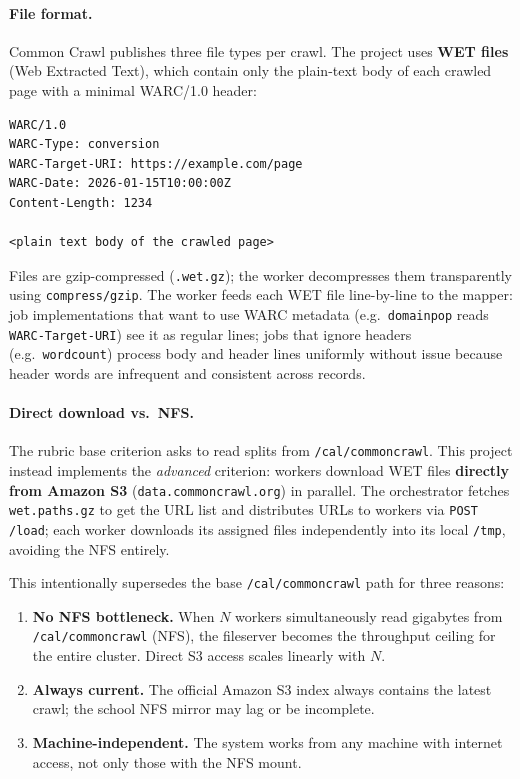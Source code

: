 \documentclass[11pt,a4paper]{article}
\begin{document}
\paragraph{File format.}
Common Crawl publishes three file types per crawl. The project uses
\textbf{WET files} (Web Extracted Text), which contain only the plain-text
body of each crawled page with a minimal WARC/1.0 header:
\begin{lstlisting}[style=codeblock]
WARC/1.0
WARC-Type: conversion
WARC-Target-URI: https://example.com/page
WARC-Date: 2026-01-15T10:00:00Z
Content-Length: 1234

<plain text body of the crawled page>
\end{lstlisting}
Files are gzip-compressed (\texttt{.wet.gz}); the worker decompresses them
transparently using \texttt{compress/gzip}. The worker feeds each WET file
line-by-line to the mapper: job implementations that want to use WARC metadata
(e.g.\ \texttt{domainpop} reads \texttt{WARC-Target-URI}) see it as regular
lines; jobs that ignore headers (e.g.\ \texttt{wordcount}) process body and
header lines uniformly without issue because header words are infrequent and
consistent across records.

\paragraph{Direct download vs.\ NFS.}
The rubric base criterion asks to read splits from \texttt{/cal/commoncrawl}.
This project instead implements the \emph{advanced} criterion: workers download
WET files \textbf{directly from Amazon S3} (\texttt{data.commoncrawl.org}) in
parallel. The orchestrator fetches \texttt{wet.paths.gz} to get the URL list and
distributes URLs to workers via \texttt{POST /load}; each worker downloads its
assigned files independently into its local \texttt{/tmp}, avoiding the NFS
entirely.

This intentionally supersedes the base \texttt{/cal/commoncrawl} path for three
reasons:
\begin{enumerate}[leftmargin=1.5em]
  \item \textbf{No NFS bottleneck.} When $N$ workers simultaneously read
  gigabytes from \texttt{/cal/commoncrawl} (NFS), the fileserver becomes the
  throughput ceiling for the entire cluster. Direct S3 access scales linearly
  with $N$.
  \item \textbf{Always current.} The official Amazon S3 index always contains the
  latest crawl; the school NFS mirror may lag or be incomplete.
  \item \textbf{Machine-independent.} The system works from any machine with
  internet access, not only those with the NFS mount.
\end{enumerate}
\end{document}

